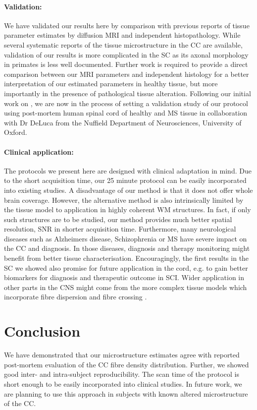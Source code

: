 \paragraph{Validation: } We have validated our results here by comparison with previous reports of tissue parameter estimates by diffusion MRI and independent histopathology. While several systematic reports of the tissue microstructure in the \gls{CC} are available, validation of our results is more complicated in the SC as its axonal morphology in primates is less well documented. Further work is required to provide a direct comparison between our MRI parameters and independent histology for a better interpretation of our estimated parameters in healthy tissue, but more importantly in the presence of pathological tissue alteration. Following our initial work on \SFasym{}, we are now in the process of setting a validation study of our protocol using post-mortem human spinal cord of healthy and MS tissue in collaboration with Dr DeLuca from the Nuffield Department of Neurosciences, University of Oxford.

\paragraph{Clinical application: } The protocols we present here are designed with clinical adaptation in mind. Due to the short acquisition time, our 25 minute protocol can be easily incorporated into existing studies. A disadvantage of our method is that it does not offer whole brain coverage. However, the alternative \OI{} method is also intrinsically limited by the tissue model to application in highly coherent WM structures. In fact, if only such structures are to be studied, our method provides much better spatial resolution, \gls{SNR} in shorter acquisition time. Furthermore, many neurological diseases such as Alzheimers disease, Schizophrenia or MS have severe impact on the \gls{CC} and diagnosis. In those diseases, diagnosis and therapy monitoring might benefit from better tissue characterisation. Encouragingly, the first results in the SC we showed also promise for future application in the cord, e.g. to gain better biomarkers for diagnosis and therapeutic outcome in SCI. Wider application in other parts in the CNS might come from the more complex tissue models which incorporate fibre dispersion and fibre crossing \citep{Zhang:2011,Zhang:2011b,Sotiropoulos:2012,Zhang:2012}.

\section{Conclusion}
We have demonstrated that our microstructure estimates agree with reported post-mortem evaluation of the \gls{CC} fibre density distribution. Further, we showed good inter- and intra-subject reproducibility. The scan time of the protocol is short enough to be easily incorporated into clinical studies. In future work, we are planning to use this approach in subjects with known altered microstructure of the \gls{CC}.